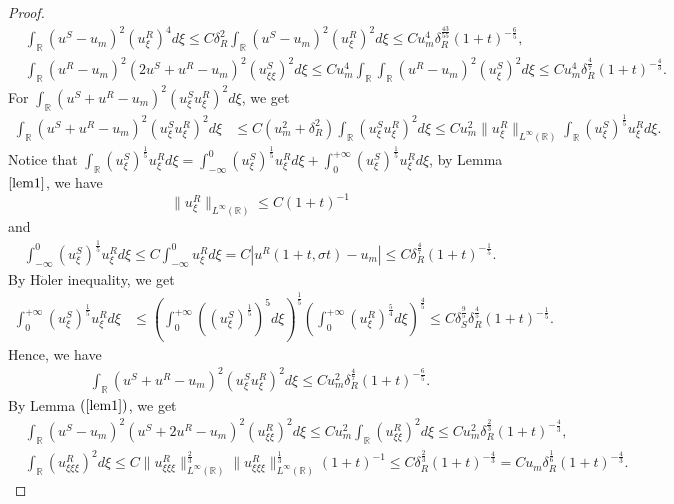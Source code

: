 \documentclass[10pt,reqno]{amsart}
\numberwithin{equation}{section}
\begin{document}
\begin{proof}
\begin{align*}
			&\int_{\mathbb{R}}(u^S-u_m)^2(u^R_{\xi})^4d\xi\leq C\delta_{R}^2\int_{\mathbb{R}}(u^S-u_m)^2(u^R_{\xi})^2d\xi\leq Cu_m^4\delta_R^{\frac{43}{55}} (1+t)^{-\frac{6}{5}},\\
			&\int_{\mathbb{R}}(u^R-u_m)^2(2u^S+u^R-u_m)^2(u_{\xi\xi}^S)^2d\xi\leq Cu_m^4\int_{\mathbb{R}}\int_{\mathbb{R}}(u^R-u_m)^2(u_{\xi}^S)^2d\xi\leq Cu_m^4\delta_R^{\frac{4}{7}}(1+t)^{-\frac{4}{3}}.
		\end{align*}
		For $\int_{\mathbb{R}}(u^S+u^R-u_m)^2(u_{\xi}^Su_{\xi}^R)^2d\xi$, we get
		\begin{align*}
			\int_{\mathbb{R}}(u^S+u^R-u_m)^2(u_{\xi}^Su_{\xi}^R)^2d\xi&\leq C(u_m^2+\delta_{R}^2)\int_{\mathbb{R}}(u_{\xi}^Su_{\xi}^R)^2d\xi\leq Cu_m^2\lVert u_{\xi}^R\rVert_{L^{\infty}(\mathbb{R})}\int_{\mathbb{R}}(u_{\xi}^S)^{\frac{1}{5}}u_{\xi}^Rd\xi.
		\end{align*}
		Notice that $\int_{\mathbb{R}}(u_{\xi}^S)^{\frac{1}{5}}u_{\xi}^Rd\xi=\int_{-\infty}^0(u_{\xi}^S)^{\frac{1}{5}}u_{\xi}^Rd\xi+\int_{0}^{+\infty}(u_{\xi}^S)^{\frac{1}{5}}u_{\xi}^Rd\xi$, by Lemma $\ref{lem1}$, we have $$\lVert u_{\xi}^R\rVert_{L^{\infty}(\mathbb{R})}\leq C(1+t)^{-1}$$ 
		and
		\begin{align*}
			\int_{-\infty}^0(u_{\xi}^S)^{\frac{1}{5}}u_{\xi}^Rd\xi\leq C\int_{-\infty}^0u_{\xi}^Rd\xi=C\left|u^R(1+t,\sigma t)-u_m\right|\leq C\delta_R^{\frac{4}{7}}(1+t)^{-\frac{1}{5}}.
		\end{align*}
		By H$\ddot{\text{o}}$ler inequality, we get 
		\begin{align*}
			\int_{0}^{+\infty}(u_{\xi}^S)^{\frac{1}{5}}u_{\xi}^Rd\xi&\leq \left(\int_{0}^{+\infty}\left((u_{\xi}^S)^{\frac{1}{5}}\right)^5d\xi\right)^{\frac{1}{5}}\left(\int_{0}^{+\infty}(u_{\xi}^R)^{\frac{5}{4}}d\xi\right)^{\frac{4}{5}}\leq C\delta_{S}^{\frac{9}{5}}\delta_R^{\frac{4}{5}}(1+t)^{-\frac{1}{5}}.
		\end{align*}
		Hence, we have
		\begin{align*}
			\int_{\mathbb{R}}(u^S+u^R-u_m)^2(u_{\xi}^Su_{\xi}^R)^2d\xi\leq Cu_m^2\delta_R^{\frac{4}{7}}(1+t)^{-\frac{6}{5}}.
		\end{align*}
		By Lemma $(\ref{lem1})$, we get
		\begin{align*}
			&\int_{\mathbb{R}}(u^S-u_m)^2(u^S+2u^R-u_m)^2(u_{\xi\xi}^R)^2d\xi\leq Cu_m^2\int_{\mathbb{R}}(u_{\xi\xi}^R)^2d\xi\leq Cu_m^2\delta_R^{\frac{2}{3}} (1+t)^{-\frac{4}{3}},\\
			&\int_{\mathbb{R}}(u^R_{\xi\xi\xi})^2d\xi\leq C \|u_{\xi\xi \xi}^{R}\|_{L^\infty(\mathbb{R})}^{\frac{2}{3}} \|u_{\xi \xi\xi}^{R}\|_{L^\infty(\mathbb{R})}^{\frac{1}{3}} (1+t)^{-1} \leq C\delta_R^{\frac{2}{3}} (1+t)^{-\frac{4}{3}}=Cu_m\delta_R^{\frac{1}{6}} (1+t)^{-\frac{4}{3}}.

\end{align*}
\end{proof}
\end{document}
